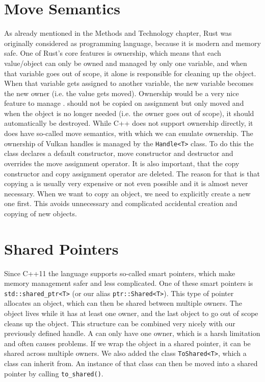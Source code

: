 \section{Move Semantics}
As already mentioned in the Methods and Technology chapter, Rust was originally considered as programming language, because it is modern and memory safe. One of Rust's core features is ownership, which means that each value/object can only be owned and managed by only one variable, and when that variable goes out of scope, it alone is responsible for cleaning up the object. When that variable gets assigned to another variable, the new variable becomes the new owner (i.e. the value gets moved). Ownership would be a very nice feature to manage \getVkObjects{}. \getVkObjects{} should not be copied on assignment but only moved and when the object is no longer needed (i.e. the owner goes out of scope), it should automatically be destroyed.
While C++ does not support ownership directly, it does have so-called move semantics, with which we can emulate ownership. The ownership of Vulkan handles is managed by the \texttt{Handle<T>} class. To do this the class declares a default constructor, move constructor and destructor and overrides the move assignment operator. It is also important, that the copy constructor and copy assignment operator are deleted. The reason for that is that copying a \getVkObject{} is usually very expensive or not even possible and it is almost never necessary. When we want to copy an object, we need to explicitly create a new one first. This avoids unnecessary and complicated accidental creation and copying of new objects.

\section{Shared Pointers}
Since C++11 the language supports so-called smart pointers, which make memory management safer and less complicated. One of these smart pointers is \texttt{std::shared\_ptr<T>} (or our alias \texttt{ptr::Shared<T>}). This type of pointer allocates an object, which can then be shared between multiple owners. The object lives while it has at least one owner, and the last object to go out of scope cleans up the object. This structure can be combined very nicely with our previously defined handle. A \getVkObject{} can only have one owner, which is a harsh limitation and often causes problems. If we wrap the object in a shared pointer, it can be shared across multiple owners. We also added the class \texttt{ToShared<T>}, which a class can inherit from. An instance of that class can then be moved into a shared pointer by calling \texttt{to\_shared()}.

